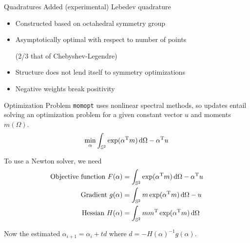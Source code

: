 \documentclass{beamer}
\renewcommand{\vec}[1]{\ensuremath{#1}}
\newcommand{\integral}[1]{\ensuremath{\int_{\mathbb{S}^2} #1 \dif \Omega}}
\newcommand{\T}[1]{\ensuremath{#1^\textnormal{T}}}
\newcommand{\momopt}{\texttt{momopt}\xspace}
\begin{document}
    \begin{frame}{Quadratures}
        Added (experimental) Lebedev quadrature
        \begin{itemize}
            \item Constructed based on octahedral symmetry group
            \item Asymptotically optimal with respect to number of points

            (2/3 that of Chebyshev-Legendre)
            \item Structure does not lend itself to symmetry optimizations
            \item \alert{Negative weights break positivity}
        \end{itemize}
    \end{frame}

    \begin{frame}{Optimization Problem}
        \momopt uses nonlinear spectral methods, so updates entail solving an optimization problem for a given constant vector \vec{u} and moments $\vec{m}(\Omega)$.
        \begin{equation*}
            \min_{\vec{\alpha}} \integral{\exp(\T{\vec{\alpha}} \vec{m})} - \T{\vec{\alpha}} \vec{u}
        \end{equation*}

        \vfill

        To use a Newton solver, we need
        \begin{align*}
            \textnormal{Objective function } F(\vec{\alpha}) &= \integral{\exp(\T{\vec{\alpha}} \vec{m})} - \T{\vec{\alpha}} \vec{u} \\
            \textnormal{Gradient } g(\vec{\alpha}) &= \integral{\vec{m} \exp(\vec{\T{\alpha}} \vec{m})} - \vec{u} \\
            \textnormal{Hessian } H(\vec{\alpha}) &= \integral{\vec{m}\T{\vec{m}} \exp(\T{\vec{\alpha}} \vec{m})}
        \end{align*}

        \vfill

        Now the estimated $\vec{\alpha}_{i+1} = \vec{\alpha}_i + t\vec{d}$ where $\vec{d} = -H(\vec{\alpha})^{-1}g(\vec{\alpha})$.
    \end{frame}
\end{document}

